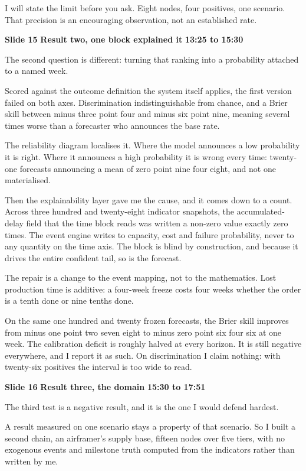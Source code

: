 \documentclass[a4paper,12pt]{article}
\newcommand{\SlideHeading}[3]{%
  \needspace{4\baselineskip}%
  \vspace{10pt}%
  \noindent\colorbox{altenBlueBg}{%
    \parbox{\dimexpr\linewidth-2\fboxsep}{%
      \vspace{3pt}%
      \textbf{\large\color{altenNavy}#1}\quad
      \textbf{\large\color{altenAzureDark}#2}%
      \hfill\textbf{\color{altenAzure}#3}%
      \vspace{3pt}}}%
  \vspace{5pt}\par}
\begin{document}
I will state the limit before you ask. Eight nodes, four positives, one scenario. That precision is an encouraging observation, not an established rate.

\SlideHeading{Slide 15}{Result two, one block explained it}{13:25 to 15:30}
The second question is different: turning that ranking into a probability attached to a named week.

Scored against the outcome definition the system itself applies, the first version failed on both axes. Discrimination indistinguishable from chance, and a Brier skill between minus three point four and minus six point nine, meaning several times worse than a forecaster who announces the base rate.

The reliability diagram localises it. Where the model announces a low probability it is right. Where it announces a high probability it is wrong every time: twenty-one forecasts announcing a mean of zero point nine four eight, and not one materialised.

Then the explainability layer gave me the cause, and it comes down to a count. Across three hundred and twenty-eight indicator snapshots, the accumulated-delay field that the time block reads was written a non-zero value exactly zero times. The event engine writes to capacity, cost and failure probability, never to any quantity on the time axis. The block is blind by construction, and because it drives the entire confident tail, so is the forecast.

The repair is a change to the event mapping, not to the mathematics. Lost production time is additive: a four-week freeze costs four weeks whether the order is a tenth done or nine tenths done.

On the same one hundred and twenty frozen forecasts, the Brier skill improves from minus one point two seven eight to minus zero point six four six at one week. The calibration deficit is roughly halved at every horizon. It is still negative everywhere, and I report it as such. On discrimination I claim nothing: with twenty-six positives the interval is too wide to read.

\SlideHeading{Slide 16}{Result three, the domain}{15:30 to 17:51}
The third test is a negative result, and it is the one I would defend hardest.

A result measured on one scenario stays a property of that scenario. So I built a second chain, an airframer's supply base, fifteen nodes over five tiers, with no exogenous events and milestone truth computed from the indicators rather than written by me.
\end{document}
